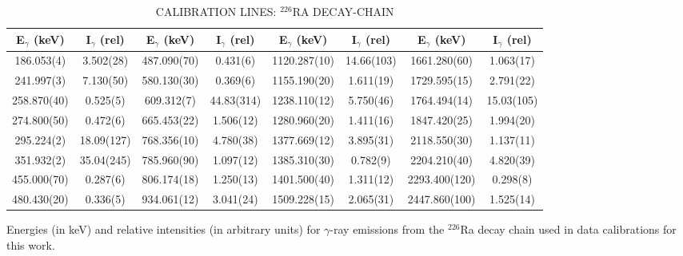 \begin{landscape}
\begin{table}[ht]
\begin{center}
\caption{CALIBRATION LINES: $^{226}$RA DECAY-CHAIN \label{tab:226Ralines}}

\begin{tabular}{c|c||c|c||c|c||c|c}
\hline
E$_\gamma$ (keV) & I$_\gamma$ (rel) & E$_\gamma$ (keV) & I$_\gamma$ (rel) & E$_\gamma$ (keV) & I$_\gamma$ (rel) & E$_\gamma$ (keV) & I$_\gamma$ (rel)  \\
\hline \hline
186.053(4)  &  3.502(28)  & 487.090(70)  &  0.431(6)   & 1120.287(10) &  14.66(103) & 1661.280(60)  &  1.063(17) \\ \hline
241.997(3)  &  7.130(50)  & 580.130(30)  &  0.369(6)   & 1155.190(20) &  1.611(19)  & 1729.595(15)  &  2.791(22) \\\hline
258.870(40) &  0.525(5)   & 609.312(7)   &  44.83(314) & 1238.110(12) &  5.750(46)  & 1764.494(14)  &  15.03(105) \\\hline
274.800(50) &  0.472(6)   & 665.453(22)  &  1.506(12)  & 1280.960(20) &  1.411(16)  & 1847.420(25)  &  1.994(20) \\\hline
295.224(2)  &  18.09(127) & 768.356(10)  &  4.780(38)  & 1377.669(12) &  3.895(31)  & 2118.550(30)  &  1.137(11) \\\hline
351.932(2)  &  35.04(245) & 785.960(90)  &  1.097(12)  & 1385.310(30) &  0.782(9)   & 2204.210(40)  &  4.820(39) \\\hline
455.000(70) &  0.287(6)   & 806.174(18)  &  1.250(13)  & 1401.500(40) &  1.311(12)  & 2293.400(120) &  0.298(8) \\\hline
480.430(20) &  0.336(5)   & 934.061(12)  &  3.041(24)  & 1509.228(15) &  2.065(31)  & 2447.860(100) &  1.525(14) \\
\end{tabular}
\vspace{10pt}
\end{center}
Energies (in keV) and relative intensities (in arbitrary units) for $\gamma$-ray emissions from the $^{226}$Ra decay chain used in data calibrations for this work.
\end{table}
\end{landscape}

